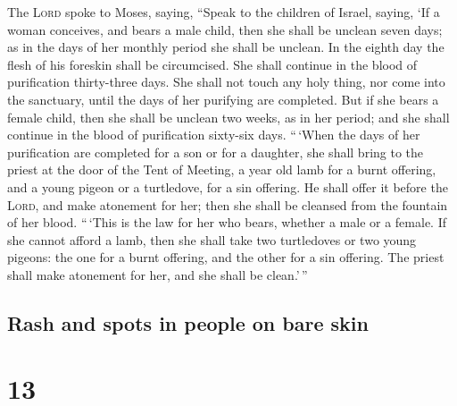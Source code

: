  The \textsc{Lord} spoke to Moses, saying, 
``Speak to the children of Israel, saying, `If a woman conceives, and
bears a male child, then she shall be unclean seven days; as in the days
of her monthly period she shall be unclean.  In the eighth
day the flesh of his foreskin shall be circumcised.  She
shall continue in the blood of purification thirty-three days. She shall
not touch any holy thing, nor come into the sanctuary, until the days of
her purifying are completed.  But if she bears a female
child, then she shall be unclean two weeks, as in her period; and she
shall continue in the blood of purification sixty-six days.
 ``\,`When the days of her purification are completed for
a son or for a daughter, she shall bring to the priest at the door of
the Tent of Meeting, a year old lamb for a burnt offering, and a young
pigeon or a turtledove, for a sin offering.  He shall
offer it before the \textsc{Lord}, and make atonement for her; then she
shall be cleansed from the fountain of her blood. ``\,`This is the law
for her who bears, whether a male or a female.  If she
cannot afford a lamb, then she shall take two turtledoves or two young
pigeons: the one for a burnt offering, and the other for a sin offering.
The priest shall make atonement for her, and she shall be clean.'\,''

\hypertarget{rash-and-spots-in-people-on-bare-skin}{%
\subsection{Rash and spots in people on bare
skin}\label{rash-and-spots-in-people-on-bare-skin}}

\hypertarget{section-12}{%
\section{13}\label{section-12}}


